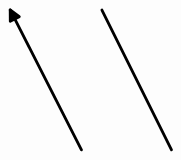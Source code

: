 \documentclass[10pt]{article}
\theoremstyle{plain}
\theoremstyle{remark}
\begin{document}
\[\begin{pgfpicture}
\begin{pgfscope}
\pgfpathlineto{\pgfqpoint{1.498300in}{3.697596in}}%
\pgfpathlineto{\pgfqpoint{1.427545in}{3.626930in}}%
\pgfpathclose%
\pgfusepath{stroke,fill}%
\end{pgfscope}%
\begin{pgfscope}%
\pgfpathrectangle{\pgfqpoint{0.224216in}{0.187957in}}{\pgfqpoint{3.754528in}{5.640000in}} %
\pgfusepath{clip}%
\pgfsetroundcap%
\pgfsetroundjoin%
\pgfsetlinewidth{2.007500pt}%
\definecolor{currentstroke}{rgb}{0.000000,0.000000,0.000000}%
\pgfsetstrokecolor{currentstroke}%
\pgfsetdash{}{0pt}%
\pgfpathmoveto{\pgfqpoint{2.918703in}{2.301689in}}%
\pgfpathquadraticcurveto{\pgfqpoint{2.559798in}{3.007944in}}{\pgfqpoint{2.214964in}{3.686513in}}%
\pgfusepath{stroke}%
\end{pgfscope}%
\begin{pgfscope}%
\pgfpathrectangle{\pgfqpoint{0.224216in}{0.187957in}}{\pgfqpoint{3.754528in}{5.640000in}} %
\pgfusepath{clip}%
\pgfsetroundcap%
\pgfsetroundjoin%
\definecolor{currentfill}{rgb}{0.000000,0.000000,0.000000}%
\pgfsetfillcolor{currentfill}%
\pgfsetlinewidth{2.007500pt}%
\definecolor{currentstroke}{rgb}{0.000000,0.000000,0.000000}%
\pgfsetstrokecolor{currentstroke}%
\pgfsetdash{}{0pt}%
\pgfpathmoveto{\pgfqpoint{2.215693in}{3.574712in}}%
\pgfpathlineto{\pgfqpoint{2.214964in}{3.686513in}}%
\pgfpathlineto{\pgfqpoint{2.304842in}{3.620016in}}%
\pgfpathlineto{\pgfqpoint{2.215693in}{3.574712in}}%
\pgfpathclose%
\pgfusepath{stroke,fill}%
\end{pgfscope}%
\begin{pgfscope}%
\pgfpathrectangle{\pgfqpoint{0.224216in}{0.187957in}}{\pgfqpoint{3.754528in}{5.640000in}} %
\pgfusepath{clip}%
\pgfsetroundcap%
\pgfsetroundjoin%
\pgfsetlinewidth{2.007500pt}%
\definecolor{currentstroke}{rgb}{0.000000,0.000000,0.000000}%
\pgfsetstrokecolor{currentstroke}%
\pgfsetdash{}{0pt}%
\pgfpathmoveto{\pgfqpoint{3.807944in}{2.302572in}}%
\pgfpathquadraticcurveto{\pgfqpoint{3.457502in}{3.007949in}}{\pgfqpoint{3.120879in}{3.685513in}}%
\pgfusepath{stroke}%
\end{pgfscope}%
\begin{pgfscope}%
\pgfpathrectangle{\pgfqpoint{0.224216in}{0.187957in}}{\pgfqpoint{3.754528in}{5.640000in}} %
\pgfusepath{clip}%
\pgfsetroundcap%
\pgfsetroundjoin%
\definecolor{currentfill}{rgb}{0.000000,0.000000,0.000000}%
\pgfsetfillcolor{currentfill}%
\pgfsetlinewidth{2.007500pt}%
\definecolor{currentstroke}{rgb}{0.000000,0.000000,0.000000}%
\pgfsetstrokecolor{currentstroke}%
\pgfsetdash{}{0pt}%
\pgfpathmoveto{\pgfqpoint{3.120593in}{3.573710in}}%
\pgfpathlineto{\pgfqpoint{3.120879in}{3.685513in}}%

\end{pgfscope}
\end{pgfpicture}\]
\end{document}

